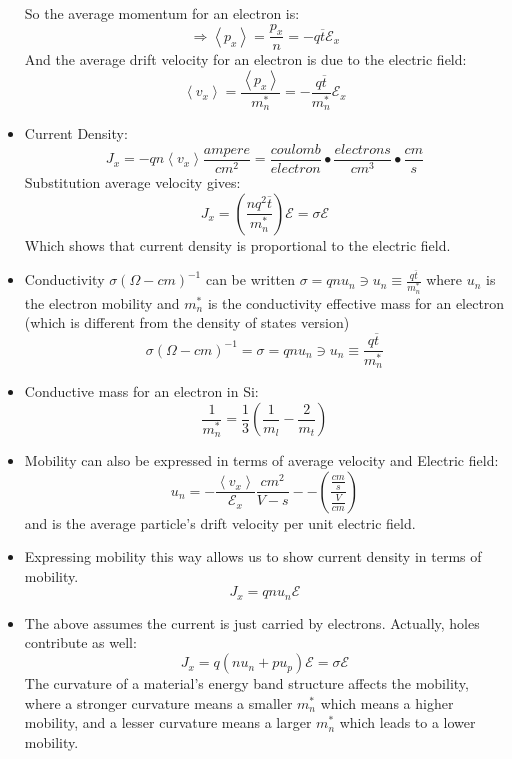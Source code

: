 \documentclass{article}
\begin{document}
\begin{itemize}
  So the average momentum for an electron is:
  \begin{equation}
    \Rightarrow \left<p_x\right>=\frac{p_x}{n} = -q\overline{t}\mathcal{E}_x
  \end{equation}
  And the average drift velocity for an electron is due to the electric field:
  \begin{equation}
    \left<v_x\right>=\frac{\left<p_x\right>}{m_n^*}=-\frac{q\overline{t}}{m_n^*}\mathcal{E}_x
  \end{equation}
\item Current Density:
  \begin{equation}
    J_x=-qn\left<v_x\right> \frac{ampere}{cm^2} = \frac{coulomb}{electron}\bullet\frac{electrons}{cm^3}\bullet\frac{cm}{s}
  \end{equation}
  Substitution average velocity gives:
  \begin{equation}
    J_x=(\frac{nq^2\overline{t}}{m_n^*})\mathcal{E} = \sigma\mathcal{E}
  \end{equation}
  Which shows that current density is proportional to the electric field.
\item Conductivity $\sigma(\Omega-cm)^{-1}$ can be written $\sigma=qnu_n\ni u_n\equiv\frac{q\overline{t}}{m_n^*}$ where $u_n$ is the electron mobility and $m_n^*$ is the conductivity effective mass for an electron (which is different from the density of states version)
  \begin{equation}
    \sigma(\Omega-cm)^{-1}=\sigma=qnu_n\ni u_n\equiv\frac{q\overline{t}}{m_n^*}
  \end{equation}
\item Conductive mass for an electron in Si:
  \begin{equation}
    \frac{1}{m_n^*} = \frac{1}{3}(\frac{1}{m_l} - \frac{2}{m_t})
  \end{equation}
\item Mobility can also be expressed in terms of average velocity and Electric field:
  \begin{equation}
    u_n=-\frac{\left<v_x\right>}{\mathcal{E}_x}\frac{cm^2}{V-s} -- (\frac{\frac{cm}{s}}{\frac{V}{cm}})
    \end{equation}
  and is the average particle's drift velocity per unit electric field.
\item Expressing mobility this way allows us to show current density in terms of mobility.
  \begin{equation}
    J_x=qnu_n\mathcal{E}
  \end{equation}
\item The above assumes the current is just carried by electrons.  Actually, holes contribute as well:
  \begin{equation}
    J_x=q(nu_n + pu_p)\mathcal{E} = \sigma\mathcal{E}
  \end{equation}
  The curvature of a material's energy band structure affects the mobility, where a stronger curvature means a smaller $m_n^*$ which means a higher mobility, and a lesser curvature means a larger $m_n^*$ which leads to a lower mobility.
\end{itemize}
\end{document}
